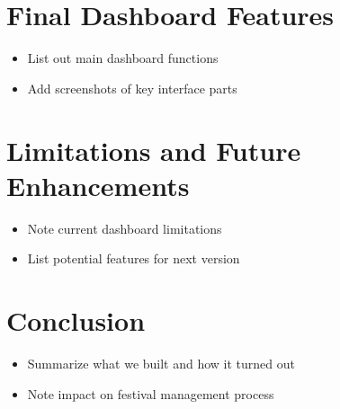 \section{Final Dashboard Features}
\label{sec:implementation-final-dashboard}
\begin{itemize}
    \item List out main dashboard functions
    \item Add screenshots of key interface parts
\end{itemize}


\section{Limitations and Future Enhancements}
\label{sec:implementation-limitations-enhancements}
\begin{itemize}
    \item Note current dashboard limitations
    \item List potential features for next version
\end{itemize}


\section{Conclusion}
\label{sec:implementation-conclusion}
\begin{itemize}
    \item Summarize what we built and how it turned out
    \item Note impact on festival management process
\end{itemize}

